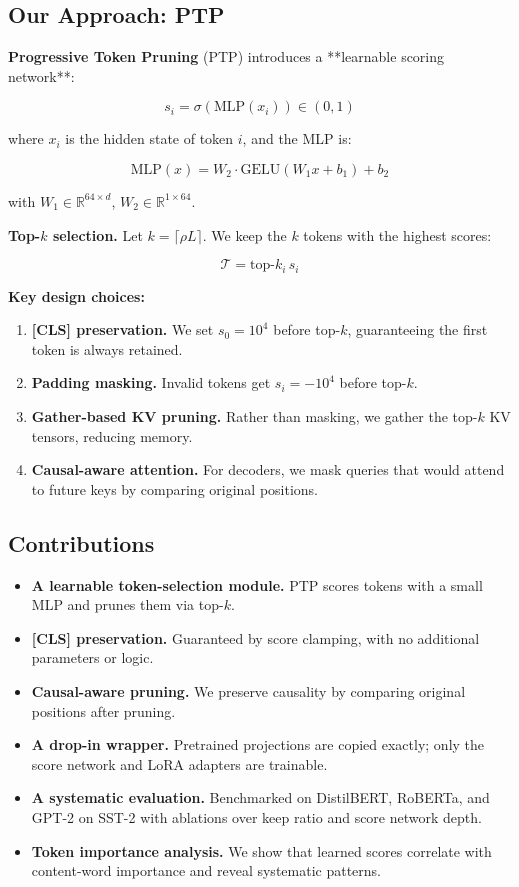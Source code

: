 \subsection{Our Approach: PTP}

\textbf{Progressive Token Pruning} (PTP) introduces a **learnable scoring 
network**:

\[
s_i = \sigma\left(\text{MLP}(x_i)\right) \in (0, 1)
\tag{1.1}
\]

where $x_i$ is the hidden state of token $i$, and the MLP is:

\[
\text{MLP}(x) = W_2 \cdot \text{GELU}(W_1 x + b_1) + b_2
\tag{1.2}
\]

with $W_1 \in \mathbb{R}^{64 \times d}$, $W_2 \in \mathbb{R}^{1 \times 64}$.

\textbf{Top-$k$ selection.} Let $k = \lceil \rho L \rceil$. We keep the $k$ 
tokens with the highest scores:

\[
\mathcal{T} = \text{top-}k_i \, s_i
\tag{1.3}
\]

\textbf{Key design choices:}

\begin{enumerate}
\item \textbf{[CLS] preservation.} We set $s_0 = 10^4$ before top-$k$, guaranteeing
  the first token is always retained.
\item \textbf{Padding masking.} Invalid tokens get $s_i = -10^4$ before top-$k$.
\item \textbf{Gather-based KV pruning.} Rather than masking, we gather the top-$k$
  KV tensors, reducing memory.
\item \textbf{Causal-aware attention.} For decoders, we mask queries that would
  attend to future keys by comparing original positions.

\end{enumerate}
\subsection{Contributions}

\begin{itemize}
\item \textbf{A learnable token-selection module.} PTP scores tokens with a small
  MLP and prunes them via top-$k$.
\item \textbf{[CLS] preservation.} Guaranteed by score clamping, with no additional
  parameters or logic.
\item \textbf{Causal-aware pruning.} We preserve causality by comparing original
  positions after pruning.
\item \textbf{A drop-in wrapper.} Pretrained projections are copied exactly; only
  the score network and LoRA adapters are trainable.
\item \textbf{A systematic evaluation.} Benchmarked on DistilBERT, RoBERTa, and
  GPT-2 on SST-2 with ablations over keep ratio and score network depth.
\item \textbf{Token importance analysis.} We show that learned scores correlate with
  content-word importance and reveal systematic patterns.

\end{itemize}
